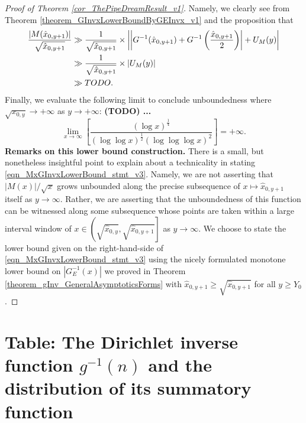 \documentclass[11pt,reqno,a4letter]{article}
\numberwithin{figure}{section}
\numberwithin{table}{section}
\theoremstyle{plain}
\numberwithin{theorem}{section}
\theoremstyle{definition}
\begin{document}
\begin{proof}[Proof of Theorem \ref{cor_ThePipeDreamResult_v1}]
Namely, we clearly see from Theorem \ref{theorem_GInvxLowerBoundByGEInvx_v1} and the 
proposition that 
\begin{align} 
\notag 
\frac{|M(\hat{x}_{0,y+1})|}{\sqrt{\hat{x}_{0,y+1}}} & \gg \frac{1}{\sqrt{\hat{x}_{0,y+1}}} \times 
     \left\lvert \left\lvert 
     G^{-1}(\hat{x}_{0,y+1}) + G^{-1}\left(\frac{\hat{x}_{0,y+1}}{2}\right) \right\rvert + 
     U_M(y) \right\rvert \\ 
\notag 
     & \gg \frac{1}{\sqrt{\hat{x}_{0,y+1}}} \times \left\lvert U_M(y) \right\rvert \\ 
\label{eqn_MxGInvxLowerBound_stmt_v3} 
     & \gg TODO. 
\end{align} 
Finally, we evaluate the following limit to conclude unboundedness 
where $\sqrt{x_{0,y}} \rightarrow +\infty$ as $y \rightarrow +\infty$: 
\textbf{(TODO) ... } 
\[
\lim_{x \rightarrow \infty} \left[\frac{(\log x)^{\frac{1}{4}}}{ 
     (\log\log x)^{\frac{1}{2}} (\log\log\log x)^2}  
     \right] = +\infty. 
\] 
\textbf{Remarks on this lower bound construction.} 
There is a small, but nonetheless insightful point to explain about a 
technicality in stating \eqref{eqn_MxGInvxLowerBound_stmt_v3}. 
Namely, we are not asserting that 
$|M(x)| / \sqrt{x}$ grows unbounded along the precise subsequence of 
$x \mapsto \hat{x}_{0,y+1}$ itself as $y \rightarrow \infty$. 
Rather, we are asserting that the unboundedness of this function 
can be witnessed along some subsequence whose points are taken within a 
large interval window of 
$x \in \left(\sqrt{\hat{x}_{0,y}}, \sqrt{\hat{x}_{0,y+1}}\right]$ as 
$y \rightarrow \infty$. 
We choose to state the lower bound given on the right-hand-side of 
\eqref{eqn_MxGInvxLowerBound_stmt_v3} using the nicely formulated 
monotone lower bound on $|G_E^{-1}(x)|$ we proved in 
Theorem \ref{theorem_gInv_GeneralAsymptoticsForms} 
with $\hat{x}_{0,y+1} \geq \sqrt{\hat{x}_{0,y+1}}$ for all $y \geq Y_0$. 
\end{proof} 

\newpage 
\renewcommand{\refname}{References} 
{}


\newpage
\setcounter{section}{0} 
\renewcommand{\thesection}{T.\arabic{section}} 

\section{Table: The Dirichlet inverse function $g^{-1}(n)$ and the 
         distribution of its summatory function} 
\label{table_conjecture_Mertens_ginvSeq_approx_values}
\end{document}
